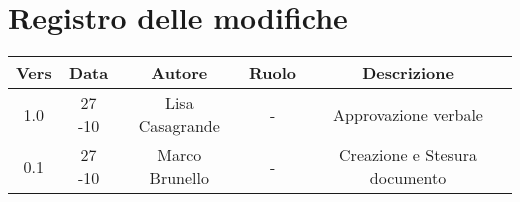 \section{Registro delle modifiche}

\begin{table}[htbp]
	\begin{tabular}{|c|c|c|c|c|}
		\hline
		\rowcolor[gray]{0.9}
		Vers & Data & Autore & Ruolo & Descrizione \\
                    \hline
		1.0 & 27 -10 & Lisa Casagrande & - & Approvazione verbale \\
		\hline
		0.1 & 27 -10 & Marco Brunello & - & Creazione e Stesura documento\\
                    \hline
	\end{tabular}
\end{table}